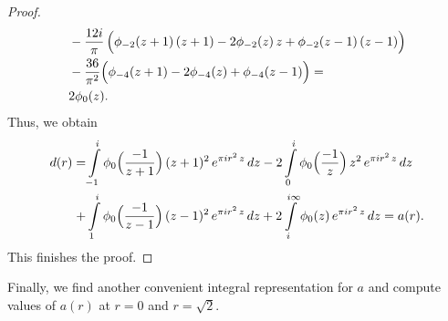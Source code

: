 \begin{proof}
\begin{align}
&-\frac{12i}{\pi}\,\Big(\phi_{-2}(z+1)\,(z+1)-2\phi_{-2}(z)\,z+\phi_{-2}(z-1)\,(z-1)\Big)\notag\\
&-\frac{36}{\pi^2}\Big(\phi_{-4}(z+1)-2\phi_{-4}(z)+\phi_{-4}(z-1)\Big)=\notag\\
&2\phi_0(z).
\end{align}
Thus, we obtain
\begin{align}
    d(r)=&\int\limits_{-1}^{i}\phi_0\Big(\frac{-1}{z+1}\Big)\,(z+1)^2\,e^{\pi i r^2 \,z}\,dz
    -2\int\limits_{0}^{i}\phi_0\Big(\frac{-1}{z}\Big)\,z^2\,e^{\pi i r^2 \,z}\,dz\notag\\
    +&\int\limits_{1}^{i}\phi_0\Big(\frac{-1}{z-1}\Big)\,(z-1)^2\,e^{\pi i r^2 \,z}\,dz
    +2\int\limits_{i}^{i\infty}\phi_0(z)\,e^{\pi i r^2 \,z}\,dz=a(r).\notag
\end{align}
This finishes the proof.
\end{proof}

Finally, we find another convenient integral representation for $a$ and compute values of $a(r)$ at $r=0$ and $r=\sqrt{2}$.

